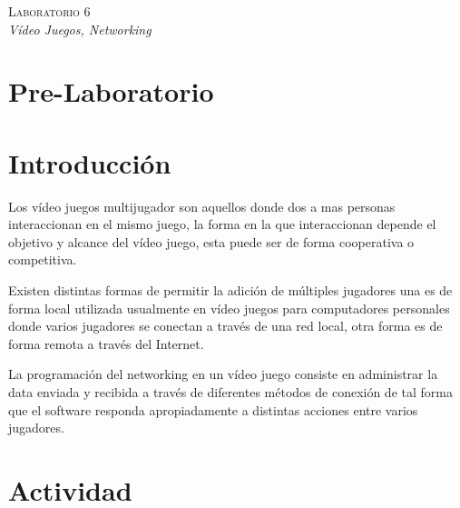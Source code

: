 \begin{center}
\textsc{\Large Laboratorio 6}~\\
\emph{\large Vídeo Juegos, Networking}
\end{center}

\section{Pre-Laboratorio}

\section{Introducción}
Los vídeo juegos multijugador son aquellos donde dos a mas personas interaccionan en el mismo juego, la forma en la que interaccionan depende el objetivo y alcance del vídeo juego, esta puede ser de forma cooperativa o competitiva.

Existen distintas formas de permitir la adición de múltiples jugadores una es de forma local utilizada usualmente en vídeo juegos para computadores personales donde varios jugadores se conectan a través de una red local, otra forma es de forma remota a través del Internet.

La programación del networking en un vídeo juego consiste en administrar la data enviada y recibida a través de diferentes métodos de conexión de tal forma que el software responda apropiadamente a distintas acciones entre varios jugadores.

\section{Actividad}
